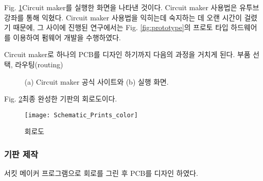 Fig. \ref{fig:circuit_maker}\는 Circuit maker를 실행한 화면을 나타낸 것이다. Circuit maker 사용법은 유투브 강좌를 통해 익혔다. Circuit maker 사용법을 익히는데 숙지하는 데 오랜 시간이 걸렸기 때문에, 그 사이에 진행된 연구에서는 Fig. \ref{fig:prototype}의 프로토 타입 하드웨어를 이용하여 펌웨어 개발을 수행하였다. 

Circuit maker로 하나의 PCB를 디자인 하기까지 다음의 과정을 거치게 된다. 부품 선택, 라우팅(routing) 




\begin{figure}[h]
	\begin{center}
	\end{center}
	\caption{(a) Circuit maker 공식 사이트와 (b) 실행 화면.}
	\label{fig:circuit_maker}
\end{figure}


Fig. \ref{fig:Schematic_Prints}\는 최종 완성한 기판의 회로도이다.
\begin{figure}
	\begin{center}
	\texttt{[image: Schematic\_Prints\_color]}
	\caption{회로도}
	\label{fig:Schematic_Prints}
	\end{center}
\end{figure}


\subsubsection{기판 제작}
서킷 메이커 프로그램으로 회로를 그린 후 PCB를 디자인 하였다. 


